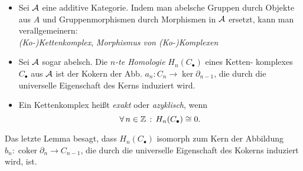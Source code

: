 \documentclass{cheat-sheet}
\newenvironment{centertikz}
  {\begin{center}\begin{tikzpicture}}
  {\end{tikzpicture}\end{center}}
\newcommand{\CC}[1]{{#1}_{\bullet}} %
\DeclareMathOperator{\coker}{coker} %
\begin{document}

\begin{defn}
  \begin{itemize}
    \item Sei $\mathcal{A}$ eine additive Kategorie. Indem man abelsche Gruppen durch Objekte aus $A$ und Gruppenmorphismen durch Morphismen in $\mathcal{A}$ ersetzt, kann man verallgemeinern: \\
    \emph{(Ko-)Kettenkomplex}, \emph{Morphismus von (Ko-)Komplexen}
    \item Sei $\mathcal{A}$ sogar abelsch. Die \emph{$n$-te Homologie} $H_n(\CC{C})$ eines Ketten- komplexes $\CC{C}$ aus $\mathcal{A}$ ist der Kokern der Abb. $a_n : C_n \to \ker \partial_{n-1}$, die durch die universelle Eigenschaft des Kerns induziert wird. \\
    \item Ein Kettenkomplex heißt \emph{exakt} oder \emph{azyklisch}, wenn
    \[ \fa{n \in \Z} H_n(\CC{C}) \cong 0. \]
  \end{itemize}
\end{defn}

\begin{bem}
  Das letzte Lemma besagt, dass $H_n(\CC{C})$ isomorph zum Kern der Abbildung $b_n : \coker \partial_n \to C_{n-1}$, die durch die universelle Eigenschaft des Kokerns induziert wird, ist.
\end{bem}
\end{document}
